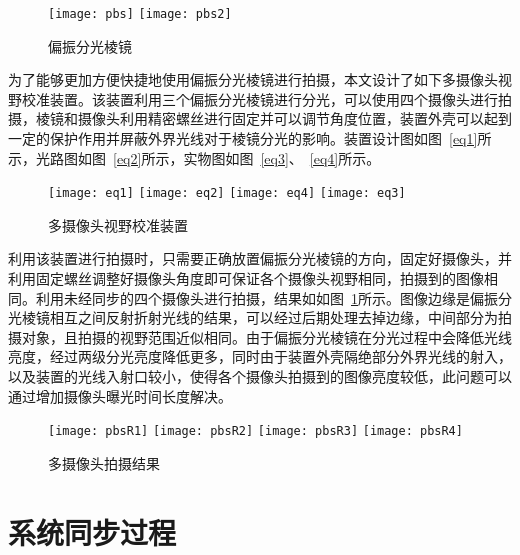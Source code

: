 \begin{figure}[h]
  \centering%
    {\texttt{[image: pbs]}}
      {\texttt{[image: pbs2]}}
  \caption{偏振分光棱镜}
\end{figure}

为了能够更加方便快捷地使用偏振分光棱镜进行拍摄，本文设计了如下多摄像头视野校准装置。该装置利用三个偏振分光棱镜进行分光，可以使用四个摄像头进行拍摄，棱镜和摄像头利用精密螺丝进行固定并可以调节角度位置，装置外壳可以起到一定的保护作用并屏蔽外界光线对于棱镜分光的影响。装置设计图如图~\ref{eq1}所示，光路图如图~\ref{eq2}所示，实物图如图~\ref{eq3}、~\ref{eq4}所示。

\begin{figure}[h]
  \centering%
    {\texttt{[image: eq1]}}
      {\texttt{[image: eq2]}}
      {\texttt{[image: eq4]}}
      {\texttt{[image: eq3]}}
  \caption{多摄像头视野校准装置}
\end{figure}

利用该装置进行拍摄时，只需要正确放置偏振分光棱镜的方向，固定好摄像头，并利用固定螺丝调整好摄像头角度即可保证各个摄像头视野相同，拍摄到的图像相同。利用未经同步的四个摄像头进行拍摄，结果如如图~\ref{pbsR}所示。图像边缘是偏振分光棱镜相互之间反射折射光线的结果，可以经过后期处理去掉边缘，中间部分为拍摄对象，且拍摄的视野范围近似相同。由于偏振分光棱镜在分光过程中会降低光线亮度，经过两级分光亮度降低更多，同时由于装置外壳隔绝部分外界光线的射入，以及装置的光线入射口较小，使得各个摄像头拍摄到的图像亮度较低，此问题可以通过增加摄像头曝光时间长度解决。

\begin{figure}[h]
  \centering%
    {\texttt{[image: pbsR1]}}
      {\texttt{[image: pbsR2]}}
      {\texttt{[image: pbsR3]}}
      {\texttt{[image: pbsR4]}}
  \caption{多摄像头拍摄结果}
  \label{pbsR}
\end{figure}

\section{系统同步过程}
\label{proSec}

